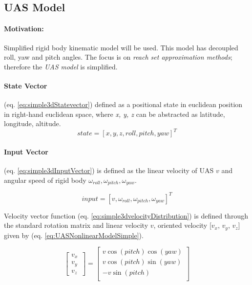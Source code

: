 \subsection{UAS Model}\label{s:UASNonlinearModel}
\paragraph{Motivation:} Simplified rigid body kinematic model will be used. This model has decoupled roll, yaw and pitch angles. The focus is on \emph{reach set approximation methods}; therefore the \emph{UAS model} is simplified.

\paragraph{State Vector} (eq. \ref{eq:simple3dStatevector}) defined as a positional state in euclidean position in right-hand euclidean space, where \emph{x, y, z} can be abstracted as latitude, longitude, altitude.
\begin{equation}\label{eq:simple3dStatevector}
    state = \left [ x,y,z, roll, pitch, yaw \right]^T
\end{equation}


\paragraph{Input Vector} (eq. \ref{eq:simple3dInputVector}) is defined as the linear velocity of UAS $v$ and angular speed of rigid body $\omega_{roll}, \omega_{pitch},\omega_{yaw}$.

\begin{equation}\label{eq:simple3dInputVector}
    input = \left [ v, \omega_{roll}, \omega_{pitch},\omega_{yaw}\right ]^T
\end{equation}


\noindent Velocity vector function (eq. \ref{eq:simple3dvelocityDistribution}) is defined through the standard rotation matrix  and linear velocity $v$, oriented velocity [$v_x$, $v_y$, $v_z$] given by (eq. \ref{eq:UASNonlinearModelSimple}).

\begin{equation}\label{eq:simple3dvelocityDistribution}
    \begin{bmatrix}
    v_x\\
    v_y\\
    v_z\
    \end{bmatrix}
    =
    \begin{bmatrix}
         v\cos(pitch)\cos(yaw)\\
         v\cos(pitch)\sin(yaw)\\
         -v\sin(pitch)\\
    \end{bmatrix}
\end{equation}

